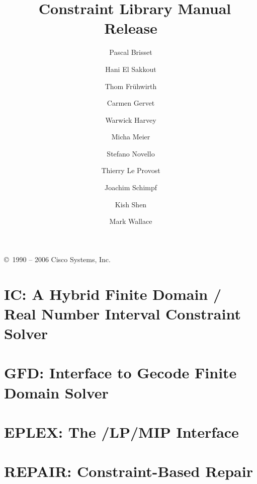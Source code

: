 \documentclass[11pt,a4paper]{book}
\title{{\Huge \eclipse\ Constraint Library Manual}\\
	\vspace{1cm}
	Release \eclipseversion
    }
\author{
Pascal Brisset
\and Hani El Sakkout
\and Thom Fr\"{u}hwirth
\and Carmen Gervet
\and Warwick Harvey
\and Micha Meier
\and Stefano Novello
\and Thierry Le Provost
\and Joachim Schimpf
\and Kish Shen
\and Mark Wallace}
\begin{document}
\maketitle

\setcounter{page}{2}
\pagestyle{empty}

\vfill

\copyright\ 1990 -- 2006 Cisco Systems, Inc. 

\bigskip\bigskip\bigskip\bigskip\bigskip\bigskip

\cleardoublepage
\pagestyle{plain}

\tableofcontents

\cleardoublepage
{}





\chapter{IC: A Hybrid Finite Domain / Real Number Interval Constraint Solver}
\label{chapic}








\chapter{GFD: Interface to Gecode Finite Domain Solver}






\chapter{EPLEX: The \eclipse/LP/MIP Interface}
\label{chapeplex}


\chapter{REPAIR: Constraint-Based Repair}
\label{chaprepair}




\newpage
\printindex
\newpage


\end{document}
